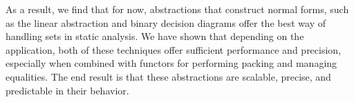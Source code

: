 
As a result, we find that for now, abstractions that construct normal forms, such as the linear abstraction and binary decision diagrams offer the best way of handling sets in static analysis.  We have shown that depending on the application, both of these techniques offer sufficient performance and precision, especially when combined with functors for performing packing and managing equalities.  The end result is that these abstractions are scalable, precise, and predictable in their behavior.